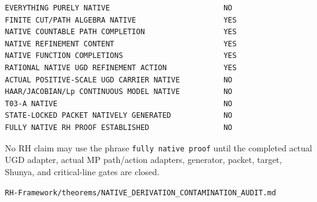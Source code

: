 \begin{verbatim}
EVERYTHING PURELY NATIVE                          NO
FINITE CUT/PATH ALGEBRA NATIVE                    YES
NATIVE COUNTABLE PATH COMPLETION                  YES
NATIVE REFINEMENT CONTENT                         YES
NATIVE FUNCTION COMPLETIONS                       YES
RATIONAL NATIVE UGD REFINEMENT ACTION             YES
ACTUAL POSITIVE-SCALE UGD CARRIER NATIVE          NO
HAAR/JACOBIAN/Lp CONTINUOUS MODEL NATIVE          NO
T03-A NATIVE                                      NO
STATE-LOCKED PACKET NATIVELY GENERATED            NO
FULLY NATIVE RH PROOF ESTABLISHED                 NO
\end{verbatim}

No RH claim may use the phrase \texttt{fully\ native\ proof} until the completed actual
UGD adapter, actual MP path/action adapters, generator, packet, target,
Shunya, and critical-line gates are closed.

\begin{flushright}\small\texttt{RH-Framework/theorems/NATIVE\_DERIVATION\_CONTAMINATION\_AUDIT.md}\end{flushright}
